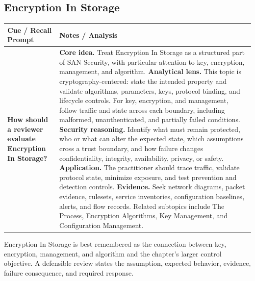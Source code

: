 \documentclass[11pt]{article}
\newcommand{\CornellHeader}{%
\rowcolor{Navy}\color{white}\bfseries Cue / Recall Prompt & \color{white}\bfseries Notes / Analysis\\\hline}
\newcommand{\CornellRow}[2]{%
\cellcolor{CueGray}\RaggedRight\textbf{#1} & \RaggedRight #2\\\hline}
\begin{document}
\subsection*{Encryption In Storage}
\begin{longtable}{>{\RaggedRight\arraybackslash}p{}|>{\RaggedRight\arraybackslash}p{}}
\CornellHeader
\CornellRow{How should a reviewer evaluate Encryption In Storage?}{\textbf{Core idea.} Treat Encryption In Storage as a structured part of SAN Security, with particular attention to key, encryption, management, and algorithm. \textbf{Analytical lens.} This topic is cryptography-centered: state the intended property and validate algorithms, parameters, keys, protocol binding, and lifecycle controls. For key, encryption, and management, follow traffic and state across each boundary, including malformed, unauthenticated, and partially failed conditions. \textbf{Security reasoning.} Identify what must remain protected, who or what can alter the expected state, which assumptions cross a trust boundary, and how failure changes confidentiality, integrity, availability, privacy, or safety. \textbf{Application.} The practitioner should trace traffic, validate protocol state, minimize exposure, and test prevention and detection controls. \textbf{Evidence.} Seek network diagrams, packet evidence, rulesets, service inventories, configuration baselines, alerts, and flow records. Related subtopics include The Process, Encryption Algorithms, Key Management, and Configuration Management.}
\end{longtable}
\begin{topicsummary}
Encryption In Storage is best remembered as the connection between key, encryption, management, and algorithm and the chapter's larger control objective. A defensible review states the assumption, expected behavior, evidence, failure consequence, and required response.
\end{topicsummary}
\end{document}
